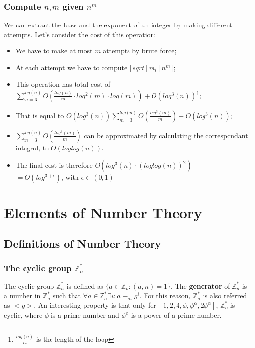 \documentclass[12pt, a4paper, english]{report}
\begin{document}
\subsection{Compute $n, m$ given $n^{m}$}
We can extract the base and the exponent of an integer by making different attempts.\newline
Let's consider the cost of this operation:
\begin{itemize}
    \item We have to make at most $m$ attempts by brute force;
    \item At each attempt we have to compute $\lfloor sqrt[m_{i}]{n^{m}} \rfloor$;
    \item This operation has total cost of $\sum_{m=3}^{log(n)} O(\frac{log(n)}{m} \cdot log^{2}(m) \cdot log(m)) + O(log^{3}(n))$\footnote{$\frac{log(n)}{m}$ is the length of the loop};
    \item That is equal to $O(log^{3}(n)) \sum_{m=3}^{log(n)} O(\frac{log^{3}(m)}{m}) + O(log^{3}(n))$;
    \item $\sum_{m=3}^{log(n)} O(\frac{log^{3}(m)}{m})$ can be approximated by calculating the correspondant integral, to $O(loglog(n))$.
    \item The final cost is therefore $O(log^{3}(n) \cdot (loglog(n))^{2})$ \\
    $= O(log^{3 + \epsilon})$, with $\epsilon \in (0,1)$
\end{itemize}


\chapter{Elements of Number Theory}

\section{Definitions of Number Theory}
\subsection{The cyclic group $\mathbb{Z}_{n}^{*}$}
The cyclic group $\mathbb{Z}_{n}^{*}$ is defined as $\{a \in \mathbb{Z}_{n}: (a,n) = 1\}$.\newline
The \textbf{generator} of $\mathbb{Z}_{n}^{*}$ is a number in $\mathbb{Z}_{n}^{*}$ such that
$\forall a \in \mathbb{Z}_{n}^{*} \exists i: a \equiv_{m} g^{i}$.
For this reason, $\mathbb{Z}_{n}^{*}$ is also referred as $< g >$.\newline
An interesting property is that only for $[1,2,4, \phi, \phi^{\alpha}, 2 \phi^{\alpha}]$,
 $\mathbb{Z}_{n}^{*}$ is cyclic, where $\phi$ is a prime number and $\phi^\alpha$ is a power of a prime number.\newline
\end{document}
